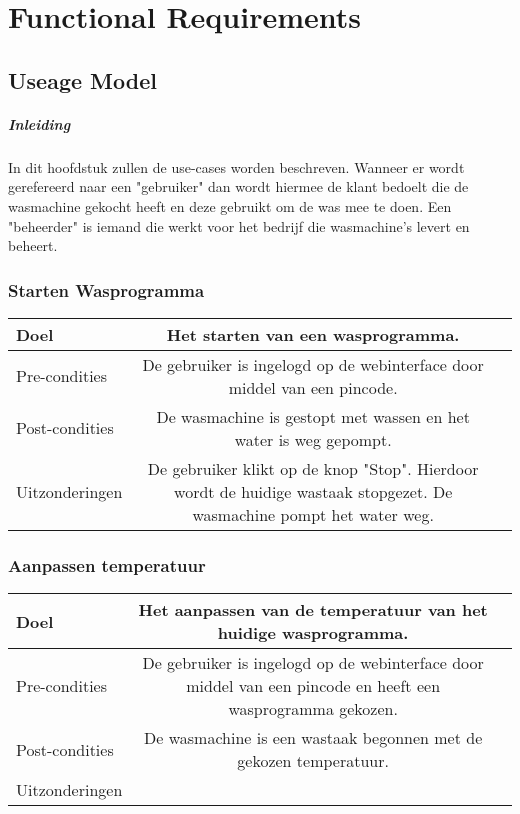 \chapter{Functional Requirements}
\section{Useage Model}

\paragraph{Inleiding}
In dit hoofdstuk zullen de use-cases worden beschreven.
Wanneer er wordt gerefereerd naar een "gebruiker" dan wordt hiermee de klant bedoelt die de wasmachine gekocht heeft en deze gebruikt om de was mee te doen.
Een "beheerder" is iemand die werkt voor het bedrijf die wasmachine's levert en beheert.

\subsection{Starten Wasprogramma}
\begin{center}
  \begin{tabular}{ l | c | r | }
    \hline
    Doel & Het starten van een wasprogramma. \\ \hline
    Pre-condities & De gebruiker is ingelogd op de webinterface door middel van een pincode. \\ \hline
    Post-condities & De wasmachine is gestopt met wassen en het water is weg gepompt. \\ \hline
    Uitzonderingen & De gebruiker klikt op de knop "Stop". Hierdoor wordt de huidige wastaak stopgezet. De wasmachine pompt het water weg. \\
    \hline
  \end{tabular}
\end{center}

\subsection{Aanpassen temperatuur}
\begin{center}
  \begin{tabular}{ l | c | r | }
    \hline
    Doel & Het aanpassen van de temperatuur van het huidige wasprogramma. \\ \hline
    Pre-condities & De gebruiker is ingelogd op de webinterface door middel van een pincode en heeft een wasprogramma gekozen. \\ \hline
    Post-condities & De wasmachine is een wastaak begonnen met de gekozen temperatuur. \\ \hline
    Uitzonderingen &  \\
    \hline
  \end{tabular}
\end{center}

